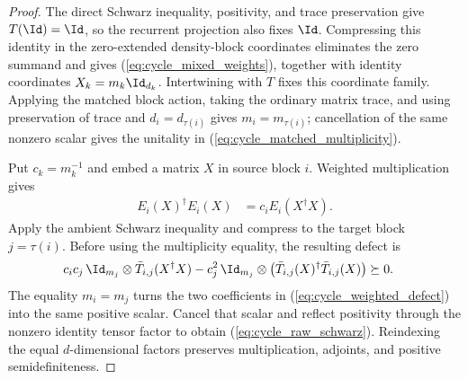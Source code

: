 \begin{proof}
    \leanok
    The direct Schwarz inequality, positivity, and trace preservation give
    $T(\Id)=\Id$, so the recurrent projection also fixes $\Id$. Compressing
    this identity in the zero-extended density-block coordinates eliminates
    the zero summand and gives (\ref{eq:cycle_mixed_weights}), together with
    identity coordinates $X_k=m_k\Id_{d_k}$. Intertwining with $T$ fixes this
    coordinate family. Applying the matched block action, taking the ordinary
    matrix trace, and using preservation of trace and
    $d_i=d_{\tau(i)}$ gives $m_i=m_{\tau(i)}$; cancellation of the same
    nonzero scalar gives the unitality in
    (\ref{eq:cycle_matched_multiplicity}).

    Put $c_k=m_k^{-1}$ and embed a matrix $X$ in source block $i$. Weighted
    multiplication gives
    \begin{align}
        E_i(X)^\dagger E_i(X)&=c_i E_i(X^\dagger X).
    \end{align}
    Apply the ambient Schwarz inequality and compress to the target block
    $j=\tau(i)$. Before using the multiplicity equality, the resulting defect
    is
    \begin{align}
        c_i c_j\,\Id_{m_j}\otimes
          \bar T_{i,j}(X^\dagger X)
        -c_j^2\,\Id_{m_j}\otimes
          \bigl(\bar T_{i,j}(X)^\dagger\bar T_{i,j}(X)\bigr)
        &\succeq0. \label{eq:cycle_weighted_defect}
    \end{align}
    The equality $m_i=m_j$ turns the two coefficients in
    (\ref{eq:cycle_weighted_defect}) into the same positive scalar. Cancel
    that scalar and reflect positivity through the nonzero identity tensor
    factor to obtain (\ref{eq:cycle_raw_schwarz}). Reindexing the equal
    $d$-dimensional factors preserves multiplication, adjoints, and positive
    semidefiniteness.
\end{proof}

